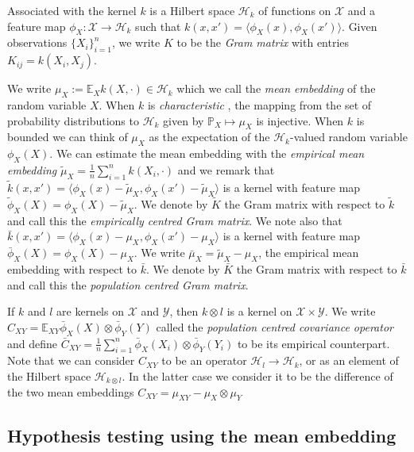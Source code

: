 \documentclass[]{article}
\begin{document}
Associated with the kernel $k$ is a Hilbert space $\mathcal{H}_k$ of functions on $\mathcal{X}$ and a feature map $\phi_X:\mathcal{X}\longrightarrow\mathcal{H}_k$ such that $k(x,x') = \langle \phi_X(x),\phi_X(x')\rangle$. Given observations $\{X_i\}_{i=1}^n$, we write $K$ to be the \emph{Gram matrix} with entries $K_{ij} = k(X_i,X_j)$.  

We write $\mu_X := \mathbb{E}_X k(X,\cdot) \in \mathcal{H}_k$ which we call the \emph{mean embedding} \cite{smola2007hilbert} of the random variable $X$. When $k$ is \emph{characteristic} \cite{sriperumbudur2011universality}\cite{sriperumbudur2010hilbert}, the mapping from the set of probability distributions to $\mathcal{H}_k$ given by $\mathbb{P}_X \mapsto \mu_X$ is injective. When $k$ is bounded we can think of $\mu_X$ as the expectation of the $\mathcal{H}_k$-valued random variable $\phi_X(X)$. We can estimate the mean embedding with the \emph{empirical mean embedding} $\tilde{\mu}_X = \frac{1}{n}\sum_{i=1}^n k(X_i,\cdot)$ and we remark that $\tilde{k}(x,x') = \langle\phi_X(x)-\tilde{\mu}_X,\phi_X(x')-\tilde{\mu}_X\rangle$ is a kernel with feature map $\tilde{\phi}_X(X) = \phi_X(X) - \tilde{\mu}_X$. We denote by $\tilde{K}$ the Gram matrix with respect to $\tilde{k}$ and call this the \emph{empirically centred Gram matrix}. We note also that $\bar{k}(x,x') = \langle\phi_X(x)-\mu_X,\phi_X(x')-\mu_X\rangle$ is a kernel with feature map $\bar{\phi}_X(X) = \phi_X(X) - \mu_X$. We write $\bar\mu_X = \tilde\mu_X - \mu_X$, the empirical mean embedding with respect to $\bar{k}$. We denote by $\bar{K}$ the Gram matrix with respect to $\bar{k}$ and call this the \emph{population centred Gram matrix}. 

If $k$ and $l$ are kernels on $\mathcal{X}$ and $\mathcal{Y}$, then $k\otimes l$ is a kernel on $\mathcal{X}\times \mathcal{Y}$. We write $C_{XY} = \mathbb{E}_{XY}\bar{\phi}_X(X)\otimes\bar{\phi}_Y(Y)$ called the \emph{population centred covariance operator} and define $\bar{C}_{XY} = \frac{1}{n}\sum_{i=1}^n\bar{\phi}_X(X_i)\otimes\bar{\phi}_Y(Y_i)$ to be its empirical counterpart. Note that we can consider $C_{XY}$ to be an operator $\mathcal{H}_l \longrightarrow \mathcal{H}_k$, or as an element of the Hilbert space $\mathcal{H}_{k\otimes l}$. In the latter case we consider it to be the difference of the two mean embeddings $C_{XY}=\mu_{XY} - \mu_{X}\otimes\mu_{Y}$

\subsection{Hypothesis testing using the mean embedding}
\end{document}
